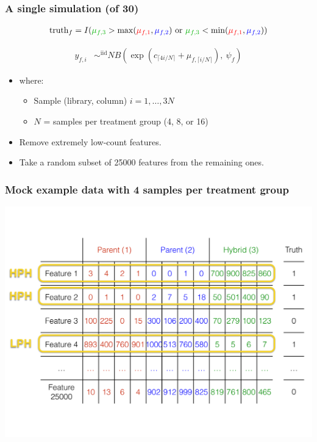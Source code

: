 \documentclass{beamer}
\numberwithin{equation}{section}
\begin{document}
\begin{frame}
\frametitle{A single simulation (of 30)}
\begin{align*}
\text{truth}_f &= I({\color{darkgreen}\mu_{f, 3}} > \max({\color{red}\mu_{f, 1}}, {\color{blue}\mu_{f, 2}}) \text{ or } {\color{darkgreen}\mu_{f, 3}} < \min({\color{red}\mu_{f, 1}}, {\color{blue}\mu_{f, 2}})) \\
\end{align*}

\pause \begin{align*}
y_{f, i} &\mathop{\sim}^{\text{iid}} NB\left (\exp \left ( c_{\lceil 4i/N \rceil} + \mu_{f, \lceil i/N \rceil} \right ), \ \psi_f  \right )
\end{align*}

\begin{itemize}
\item where:
\begin{itemize}
\item Sample (library, column) $i = 1, \ldots, 3N$ 
\item $N$ = samples per treatment group (4, 8, or 16)
\end{itemize}
\pause \item Remove extremely low-count features.
\pause \item Take a random subset of 25000 features from the remaining ones.
\end{itemize}
\end{frame}

\begin{frame}
\frametitle{Mock example data with 4 samples per treatment group}
\begin{center}
\includegraphics[scale=.28]{data}
\end{center}
\end{frame}
\end{document}
